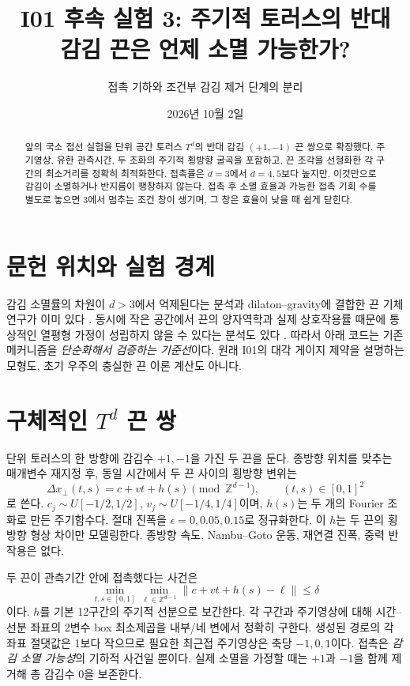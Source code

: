 \documentclass[11pt,a4paper]{article}
\title{I01 후속 실험 3: 주기적 토러스의 반대 감김 끈은 언제 소멸 가능한가?}
\author{접촉 기하와 조건부 감김 제거 단계의 분리}
\date{2026년 10월 2일}
\begin{document}
\maketitle

\begin{abstract}
앞의 국소 접선 실험을 단위 공간 토러스 $T^d$의 반대 감김
$(+1,-1)$ 끈 쌍으로 확장했다. 주기영상, 유한 관측시간,
두 조화의 주기적 횡방향 굴곡을 포함하고, 끈 조각을 선형화한
각 구간의 최소거리를 정확히 최적화한다. 접촉률은 $d=3$에서
$d=4,5$보다 높지만, 이것만으로 감김이 소멸하거나 반지름이
팽창하지 않는다. 접촉 후 소멸 효율과 가능한 접촉 기회 수를
별도로 놓으면 3에서 멈추는 조건 창이 생기며, 그 창은 효율이
낮을 때 쉽게 닫힌다.
\end{abstract}

\section{문헌 위치와 실험 경계}
감김 소멸률의 차원이 $d>3$에서 억제된다는 분석과
dilaton--gravity에 결합한 끈 기체 연구가 이미 있다
\cite{Greene2010}. 동시에 작은 공간에서 끈의 양자역학과
실제 상호작용률 때문에 통상적인 열평형 가정이 성립하지
않을 수 있다는 분석도 있다 \cite{Danos2004}.
따라서 아래 코드는 기존 메커니즘을 \emph{단순화해서 검증하는
기준선}이다. 원래 I01의 대각 게이지 제약을 설명하는 모형도,
초기 우주의 충실한 끈 이론 계산도 아니다.

\section{구체적인 $T^d$ 끈 쌍}
단위 토러스의 한 방향에 감김수 $+1,-1$을 가진 두 끈을 둔다.
종방향 위치를 맞추는 매개변수 재지정 후, 동일 시간에서
두 끈 사이의 횡방향 변위는
\begin{equation}
\Delta x_\perp(t,s)=c+vt+h(s)\pmod{\mathbb Z^{d-1}},
\qquad (t,s)\in[0,1]^2
\end{equation}
로 쓴다. $c_j\sim U[-1/2,1/2]$, $v_j\sim U[-1/4,1/4]$이며,
$h(s)$는 두 개의 Fourier 조화로 만든 주기함수다.
절대 진폭을 $\epsilon=0,0.05,0.15$로 정규화한다.
이 $h$는 두 끈의 횡방향 형상 차이만 모델링한다.
종방향 속도, Nambu--Goto 운동, 재연결 진폭, 중력 반작용은 없다.

두 끈이 관측기간 안에 접촉했다는 사건은
\begin{equation}
\min_{t,s\in[0,1]}\min_{\ell\in\mathbb Z^{d-1}}
\|c+vt+h(s)-\ell\|\le\delta
\end{equation}
이다. $h$를 기본 12구간의 주기적 선분으로 보간한다.
각 구간과 주기영상에 대해 시간--선분 좌표의 2변수 box
최소제곱을 내부/네 변에서 정확히 구한다.
생성된 경로의 각 좌표 절댓값은 1보다 작으므로 필요한
최근접 주기영상은 축당 $-1,0,1$이다.
접촉은 \emph{감김 소멸 가능성}의 기하적 사건일 뿐이다.
실제 소멸을 가정할 때는 $+1$과 $-1$을 함께 제거해
총 감김수 0을 보존한다.
\end{document}
